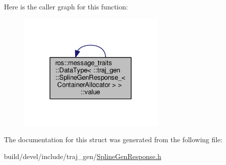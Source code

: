 Here is the caller graph for this function\+:
\nopagebreak
\begin{figure}[H]
\begin{center}
\leavevmode
\includegraphics[width=203pt]{structros_1_1message__traits_1_1_data_type_3_01_1_1traj__gen_1_1_spline_gen_response___3_01_container_allocator_01_4_01_4_a45333b91e9108b4ab9094322fcc1243b_icgraph}
\end{center}
\end{figure}




The documentation for this struct was generated from the following file\+:\begin{DoxyCompactItemize}
\item 
build/devel/include/traj\+\_\+gen/\hyperlink{_spline_gen_response_8h}{Spline\+Gen\+Response.\+h}\end{DoxyCompactItemize}
